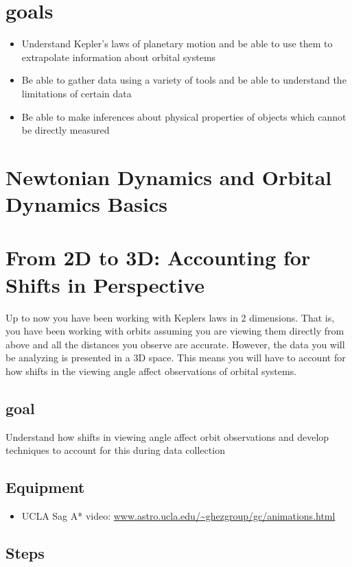 \section{goals}
\begin{itemize}
	\item Understand Kepler's laws of planetary motion and be able to use them to extrapolate information about orbital systems
	\item Be able to gather data using a variety of tools and be able to understand the limitations of certain data
	\item Be able to make inferences about physical properties of objects which cannot be directly measured
\end{itemize}

\section{Newtonian Dynamics and Orbital Dynamics Basics}

\section{From 2D to 3D: Accounting for Shifts in Perspective}
Up to now you have been working with Keplers laws in 2 dimensions. That is, you have been working with orbits assuming you are viewing them directly from above and all the distances you observe are accurate. However, the data you will be analyzing is presented in a 3D space. This means you will have to account for how shifts in the viewing angle affect observations of orbital systems. 

\subsection{goal}
Understand how shifts in viewing angle affect orbit observations and develop techniques to account for this during data collection

\subsection{Equipment}
\begin{itemize}
	\item UCLA Sag A* video: \url{www.astro.ucla.edu/~ghezgroup/gc/animations.html}
\end{itemize}
\subsection{Steps}

